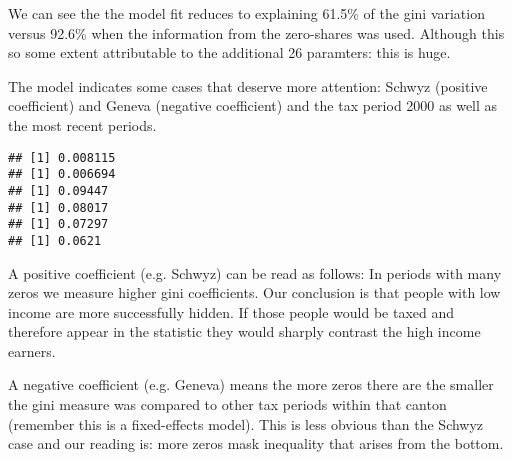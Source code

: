 We can see the the model fit reduces to explaining 61.5\% of the gini variation versus 92.6\% when the information from the zero-shares was used. Although this so some extent attributable to the additional 26 paramters: this is huge. 

The model indicates some cases that deserve more attention: Schwyz (positive coefficient) and Geneva (negative coefficient) and the tax period 2000 as well as the most recent periods.

\begin{knitrout}
\color{fgcolor}\begin{kframe}


{\ttfamily\noindent\itshape{}}\begin{verbatim}
## [1] 0.008115
## [1] 0.006694
## [1] 0.09447
## [1] 0.08017
## [1] 0.07297
## [1] 0.0621
\end{verbatim}
\end{kframe}
\end{knitrout}



A positive coefficient (e.g. Schwyz) can be read as follows: In periods with many zeros we measure higher gini coefficients. Our conclusion is that people with low income are more successfully hidden. If those people would be taxed and therefore appear in the statistic they would sharply contrast the high income earners.

A negative coefficient (e.g. Geneva) means the more zeros there are the smaller the gini measure was compared to other tax periods within that canton (remember this is a fixed-effects model). This is less obvious than the Schwyz case and our reading is: more zeros mask inequality that arises from the bottom.


